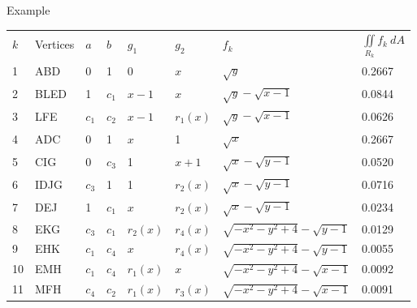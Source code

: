 \documentclass[a4paper,10pt]{article}
\begin{document}
\begin{section}{Example}
\begin{table}
\begin{center}
\begin{tabular}{|l l l l l l l l|}
  $k$ & Vertices & $a$ & $b$  & $g_1$ & $g_2$ & $f_k$ & $\iint\limits_{\!R_k} f_k~dA$\\
  1 & ABD & 0 & 1& 0 & $x$ & $\sqrt{y}$ & 0.2667\\
  2 & BLED& 1& $c_1$ & $x-1$ & $x$ & $\sqrt{y} - \sqrt{x-1}$& 0.0844\\
  3 & LFE& $c_1$ & $c_2$ & $x-1$ & $r_1(x)$&$\sqrt{y} - \sqrt{x-1}$&0.0626\\
  4 & ADC& 0 & 1 & $x$ & 1 & $\sqrt{x}$ &0.2667\\
  5 & CIG& 0 & $c_3$ & 1 & $x+1$ & $\sqrt{x} - \sqrt{y-1}$ &0.0520\\
  6 & IDJG& $c_3$ & 1 & 1 & $r_2(x)$ & $\sqrt{x} - \sqrt{y-1}$&0.0716\\
  7 & DEJ& 1& $c_1$& $x$ & $r_2(x)$ & $\sqrt{x} - \sqrt{y-1}$&0.0234\\ 
  8 & EKG& $c_3$& $c_1$& $r_2(x)$ & $r_4(x)$ & $\sqrt{-x^2-y^2+4}-\sqrt{y-1}$&0.0129\\ 
  9 & EHK& $c_1$& $c_4$& $x$& $r_4(x)$ & $\sqrt{-x^2-y^2+4}-\sqrt{y-1}$&0.0055\\
  10& EMH& $c_1$& $c_4$& $r_1(x)$& $x$ & $\sqrt{-x^2-y^2+4}-\sqrt{x-1}$&0.0092\\
  11& MFH& $c_4$& $c_2$& $r_1(x)$& $r_3(x)$ & $\sqrt{-x^2-y^2+4}-\sqrt{x-1}$&0.0091\\ 
\end{tabular}
 
\end{center}

\end{table}


 
\end{section}
\end{document}
